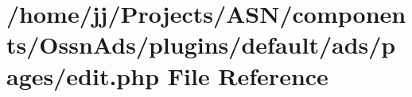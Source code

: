 \hypertarget{components_2_ossn_ads_2plugins_2default_2ads_2pages_2edit_8php}{}\section{/home/jj/\+Projects/\+A\+S\+N/components/\+Ossn\+Ads/plugins/default/ads/pages/edit.php File Reference}
\label{components_2_ossn_ads_2plugins_2default_2ads_2pages_2edit_8php}
